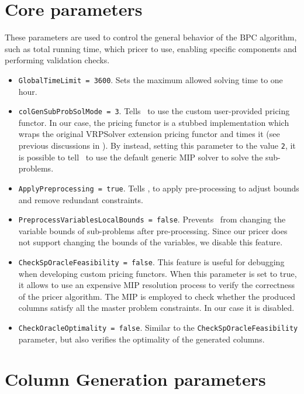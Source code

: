 \section{Core parameters}
These parameters are used to control the general behavior of the BPC algorithm,
such as total running time, which pricer to use, enabling specific
components and performing validation checks.

\begin{itemize}
	\item \texttt{GlobalTimeLimit = 3600}. Sets the maximum allowed solving time to one hour.
	\item \texttt{colGenSubProbSolMode = 3}. Tells \bapcod\ to use the custom user-provided pricing functor.
	      In our case, the pricing functor is a stubbed implementation which wraps the original VRPSolver extension pricing functor
	      and times it (see previous discussions in ).
	      By instead, setting this parameter to the value \texttt{2},
	      it is possible to tell \bapcod\ to use the default generic MIP solver to solve the sub-problems.
	\item \texttt{ApplyPreprocessing = true}. Tells \bapcod, to apply pre-processing to adjust bounds and remove redundant constraints.
	\item \texttt{PreprocessVariablesLocalBounds = false}.
	      Prevents \bapcod\ from changing the variable bounds of sub-problems after pre-processing.
	      Since our pricer does not support changing the bounds of the variables,
	      we disable this feature.
	\item \texttt{CheckSpOracleFeasibility = false}.
	      This feature is useful for debugging when developing custom pricing functors.
	      When this parameter is set to true, it allows to use an expensive MIP resolution process
	      to verify the correctness of the pricer algorithm.
	      The MIP is employed to check whether the produced columns satisfy all the master problem constraints.
	      In our case it is disabled.
	\item \texttt{CheckOracleOptimality = false}.
	      Similar to the \texttt{CheckSpOracleFeasibility} parameter, but also verifies the optimality of the generated columns.
\end{itemize}

\section{Column Generation parameters}

